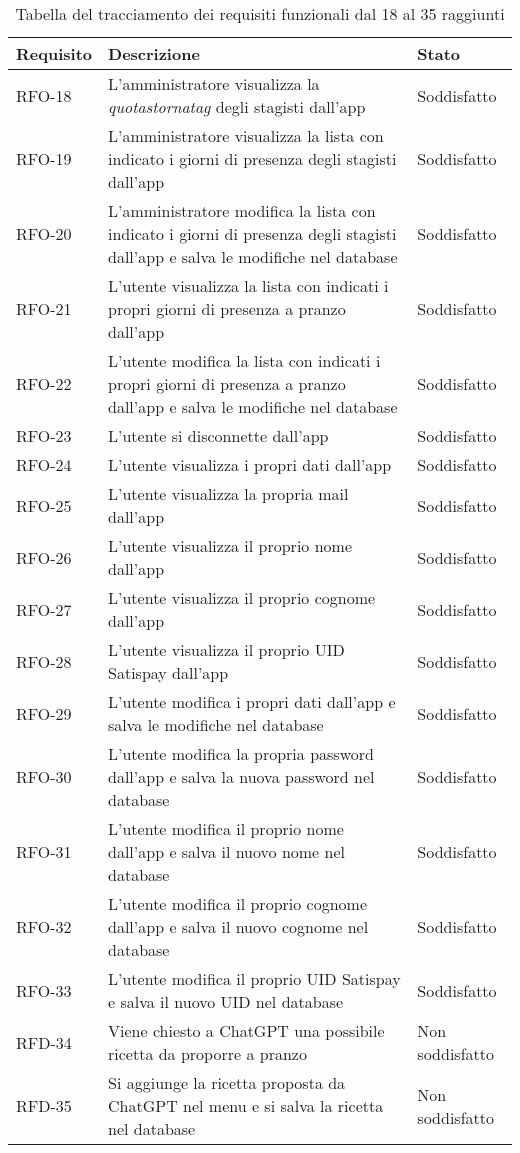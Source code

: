 \begin{table}%
\caption{Tabella del tracciamento dei requisiti funzionali dal 18 al 35 raggiunti}
\begin{tabularx}{\textwidth}{lXl}
\hline
\textbf{Requisito} & \textbf{Descrizione} & \textbf{Stato}\\
\hline\hline
RFO-18    & L'amministratore visualizza la \emph{\gls{quotastornatag}} degli stagisti dall'app & Soddisfatto \\
\hline
RFO-19    & L'amministratore visualizza la lista con indicato i giorni di presenza degli stagisti dall'app & Soddisfatto \\
\hline
RFO-20    & L'amministratore modifica la lista con indicato i giorni di presenza degli stagisti dall'app e salva le modifiche nel database & Soddisfatto \\
\hline
RFO-21    & L'utente visualizza la lista con indicati i propri giorni di presenza a pranzo dall'app & Soddisfatto \\
\hline
RFO-22    & L'utente modifica la lista con indicati i propri giorni di presenza a pranzo dall'app e salva le modifiche nel database & Soddisfatto \\
\hline
RFO-23    & L'utente si disconnette dall'app & Soddisfatto \\
\hline
RFO-24    & L'utente visualizza i propri dati dall'app & Soddisfatto \\
\hline
RFO-25    & L'utente visualizza la propria mail dall'app & Soddisfatto \\
\hline
RFO-26    & L'utente visualizza il proprio nome dall'app & Soddisfatto \\
\hline
RFO-27    & L'utente visualizza il proprio cognome dall'app & Soddisfatto \\
\hline
RFO-28    & L'utente visualizza il proprio UID Satispay dall'app & Soddisfatto \\
\hline
RFO-29    & L'utente modifica i propri dati dall'app e salva le modifiche nel database & Soddisfatto \\
\hline
RFO-30    & L'utente modifica la propria password dall'app e salva la nuova password nel database & Soddisfatto \\
\hline
RFO-31    & L'utente modifica il proprio nome dall'app e salva il nuovo nome nel database & Soddisfatto \\
\hline
RFO-32    & L'utente modifica il proprio cognome dall'app e salva il nuovo cognome nel database & Soddisfatto \\
\hline
RFO-33    & L'utente modifica il proprio UID Satispay e salva il nuovo UID nel database & Soddisfatto \\
\hline
RFD-34    & Viene chiesto a ChatGPT una possibile ricetta da proporre a pranzo & Non soddisfatto \\
\hline
RFD-35    & Si aggiunge la ricetta proposta da ChatGPT nel menu e si salva la ricetta nel database & Non soddisfatto \\
\hline
\end{tabularx}
\end{table}%

